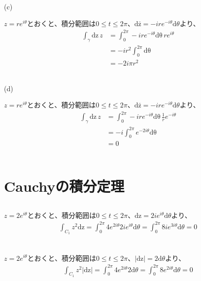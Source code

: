 \documentclass[dvipdfmx,a4paper]{jsarticle}
\begin{document}
\begin{flushleft}
(c)
\end{flushleft}
$z = re^{i\theta}$とおくと、積分範囲は$0 \leq t \leq 2\pi、\mathrm{d\bar{z}} = -ire^{-i\theta}\mathrm{d}\theta$より、
\begin{align*}
\int_{\gamma}\mathrm{dz} \, z &= \int^{2\pi}_{0} -ire^{-i\theta} \mathrm{d\theta} \, re^{i\theta}\\
&= -ir^2\int^{2\pi}_{0} \mathrm{d\theta}\\
&= -2i\pi r^2
\end{align*}
\\

\begin{flushleft}
(d)
\end{flushleft}
$z = re^{i\theta}$とおくと、積分範囲は$0 \leq t \leq 2\pi、\mathrm{d\bar{z}} = -ire^{-i\theta}\mathrm{d}\theta$より、
\begin{align*}
\int_{\gamma}\mathrm{dz}\,  z &= \int^{2\pi}_{0} -ire^{-i\theta} \mathrm{d\theta} \, \frac{1}{r}e^{-i\theta}\\
&= -i\int^{2\pi}_{0} e^{-2i\theta} \mathrm{d\theta}\\
&= 0
\end{align*}
\\


\section{Cauchyの積分定理}

\subsection{}
$z = 2e^{i\theta}$とおくと、積分範囲は$0 \leq t \leq 2\pi、\mathrm{dz} = 2ie^{i\theta}\mathrm{d}\theta$より、
\begin{align*}
\int_{C_1}z^2\mathrm{dz} = \int^{2\pi}_{0} 4e^{2i\theta} 2ie^{i\theta}\mathrm{d}\theta = \int^{2\pi}_{0} 8ie^{3i\theta}\mathrm{d}\theta = 0\\
\end{align*}

\subsection{}
$z = 2e^{i\theta}$とおくと、積分範囲は$0 \leq t \leq 2\pi、|\mathrm{dz}| = 2\mathrm{d}\theta$より、
\begin{align*}
\int_{C_1}z^2|\mathrm{dz}| = \int^{2\pi}_{0} 4e^{2i\theta}2\mathrm{d}\theta = \int^{2\pi}_{0} 8e^{2i\theta}\mathrm{d}\theta = 0\\
\end{align*}
\end{document}
